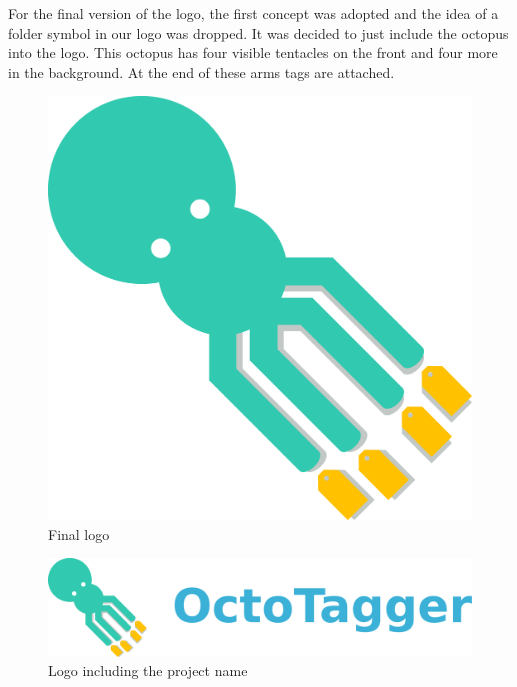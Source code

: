 For the final version of the logo, the first concept was adopted and the idea of a folder symbol in our logo was dropped. It was decided to just include the octopus into the logo. This octopus has four visible tentacles on the front and four more in the background. At the end of these arms tags are attached.

\begin{figure}
\centering
\includegraphics[width=0.5\linewidth]{images/logo.png}
\caption{Final logo}
\end{figure}

\begin{figure}
\centering
\includegraphics[width=\linewidth]{images/logo_text.png}
\caption{Logo including the project name}
\end{figure}